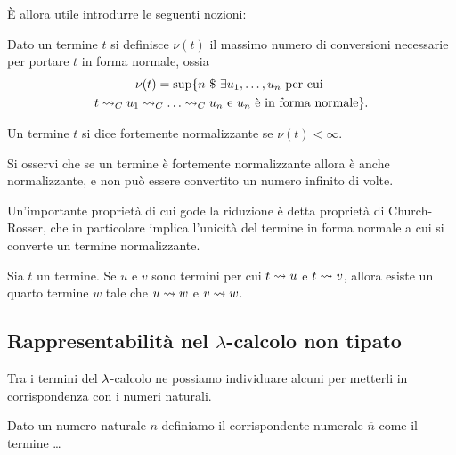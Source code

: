 \documentclass[]{marticle}
\begin{document}
\`E allora utile introdurre le seguenti nozioni:
\begin{block}[Definizione]
    Dato un termine $t$ si definisce $\nu(t)$ il massimo numero di conversioni
    necessarie per portare $t$ in forma normale, ossia
    \begin{gather*}
        \nu (t) = \sup \setof { n \st
            \exists u_1, \dots, u_n \text{ per cui } \\
            t \conv_C u_1 \conv_C \dots
            \conv_C u_n \text{ e $u_n$ \`e in forma normale}
        }.
    \end{gather*}

    Un termine $t$ si dice fortemente normalizzante se $\nu(t) < \infty$.
\end{block}

Si osservi che se un termine \`e fortemente normalizzante allora \`e anche
normalizzante, e non pu\`o essere convertito un numero infinito di volte.


Un'importante propriet\`a di cui gode la riduzione \`e detta propriet\`a di
Church-Rosser, che in particolare implica l'unicit\`a del termine in forma
normale a cui si converte un termine normalizzante.

\begin{block}[Teorema]
    Sia $t$ un termine. Se $u$ e $v$ sono termini per cui $t\rightsquigarrow u$ e $t\rightsquigarrow
    v$, allora esiste un quarto termine $w$ tale che $u\rightsquigarrow w$ e $v\rightsquigarrow w$.
\end{block}



\subsection{Rappresentabilit\`a nel $\lambda$-calcolo non tipato}

Tra i termini del $\lambda$-calcolo ne possiamo individuare alcuni per metterli in
corrispondenza con i numeri naturali.

\begin{block}[Definizione]
    Dato un numero naturale $n$ definiamo il corrispondente numerale
    $\overline{n}$ come il termine
    \dots
\end{block}
\end{document}
